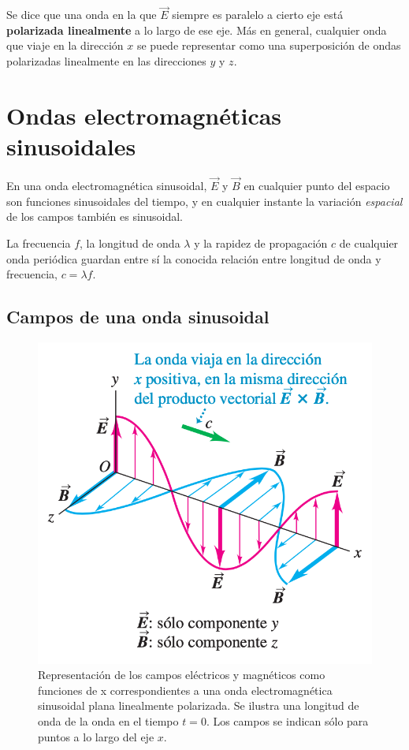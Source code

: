 Se dice que una onda en la que $\vec{E}$ siempre es paralelo a cierto eje está \textbf{polarizada linealmente} a lo largo de ese eje. Más en general, cualquier onda que viaje en la dirección $x$ se puede representar como una superposición de ondas polarizadas linealmente en las direcciones $y$ y $z$.


\section{Ondas electromagnéticas sinusoidales}
En una onda electromagnética sinusoidal, $\vec{E}$ y $\vec{B}$ en cualquier punto del espacio son funciones sinusoidales del tiempo, y en cualquier instante la variación \textit{espacial} de los campos también es sinusoidal.

La frecuencia $f$, la longitud de onda $\lambda$ y la rapidez de propagación $c$ de cualquier onda periódica guardan entre sí la conocida relación entre longitud de onda y frecuencia, $c=\lambda f$.

\subsection{Campos de una onda sinusoidal}

\begin{figure}[h]
\centering
\includegraphics[scale=0.5]{fig/sinusoidal}
\caption{Representación de los campos eléctricos y magnéticos como funciones de x correspondientes a una onda electromagnética sinusoidal plana linealmente polarizada. Se ilustra una longitud de onda de la onda en el tiempo $t = 0$. Los campos se indican sólo para puntos a lo largo del eje $x$.}
\label{fig:sinusoidal}
\end{figure}

